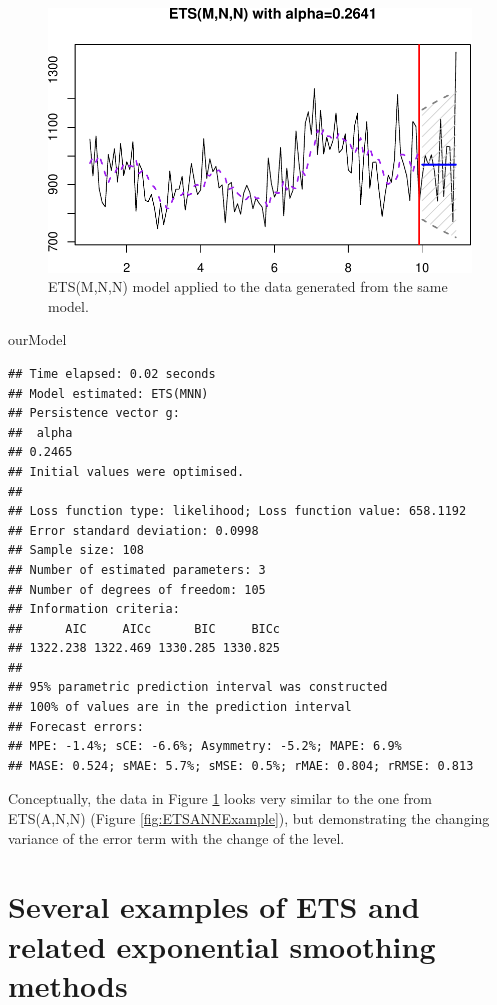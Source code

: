 \documentclass[
]{book}
\newenvironment{Shaded}{\begin{snugshade}}{\end{snugshade}}
\newcommand{\NormalTok}[1]{#1}
\theoremstyle{definition}
\theoremstyle{definition}
\theoremstyle{definition}
\theoremstyle{definition}
\theoremstyle{remark}
\begin{document}
\begin{figure}
\centering
\includegraphics{Svetunkov--2022----ADAM_files/figure-latex/ETSMNNExample-1.pdf}
\caption{\label{fig:ETSMNNExample}ETS(M,N,N) model applied to the data generated from the same model.}
\end{figure}

\begin{Shaded}
\begin{Highlighting}[]
\NormalTok{ourModel}
\end{Highlighting}
\end{Shaded}

\begin{verbatim}
## Time elapsed: 0.02 seconds
## Model estimated: ETS(MNN)
## Persistence vector g:
##  alpha 
## 0.2465 
## Initial values were optimised.
## 
## Loss function type: likelihood; Loss function value: 658.1192
## Error standard deviation: 0.0998
## Sample size: 108
## Number of estimated parameters: 3
## Number of degrees of freedom: 105
## Information criteria:
##      AIC     AICc      BIC     BICc 
## 1322.238 1322.469 1330.285 1330.825 
## 
## 95% parametric prediction interval was constructed
## 100% of values are in the prediction interval
## Forecast errors:
## MPE: -1.4%; sCE: -6.6%; Asymmetry: -5.2%; MAPE: 6.9%
## MASE: 0.524; sMAE: 5.7%; sMSE: 0.5%; rMAE: 0.804; rRMSE: 0.813
\end{verbatim}

Conceptually, the data in Figure \ref{fig:ETSMNNExample} looks very similar to the one from ETS(A,N,N) (Figure \ref{fig:ETSANNExample}), but demonstrating the changing variance of the error term with the change of the level.

\hypertarget{ETSExamples}{%
\section{Several examples of ETS and related exponential smoothing methods}\label{ETSExamples}}
\end{document}
